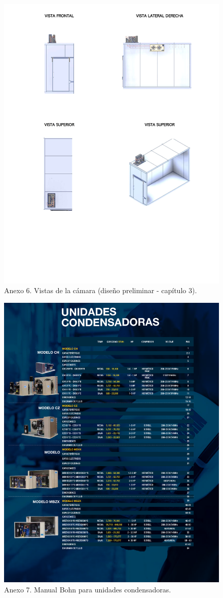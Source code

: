 	 	\begin{figure}[H]
	 	\centering
	 	\includegraphics[width=0.7\linewidth]{figures/planos.pdf}
	 	\caption*{Anexo 6. Vistas de la cámara (diseño preliminar - capítulo 3).}
	 	\label{axo-planos}
	 \end{figure}
	 
 \begin{figure}[H]
 	\centering
 	\includegraphics[width=0.8\linewidth]{figures/condensador-bohn}
	\caption*{Anexo 7. Manual Bohn para unidades condensadoras.}
 	\label{fig:axo-manual-thermo-king}
 \end{figure}
 
	 
	 